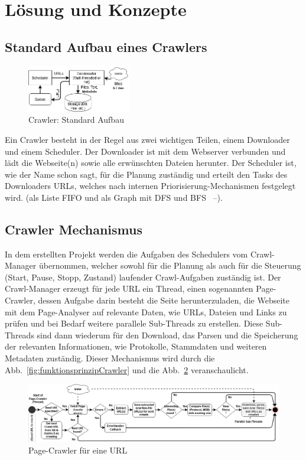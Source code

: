 \section{Lösung und Konzepte}\label{sec:02_03_loesung_konzept}
\subsection{Standard Aufbau eines Crawlers}
\begin{figure}
  \centering
    \includegraphics[width=0.4\textwidth]{images/02-Crawler/Crawler-Standard-Crawler.png}
  \caption{\label{fig:standardCrawler}Crawler: Standard Aufbau}
\end{figure}
Ein Crawler besteht in der Regel aus zwei wichtigen Teilen, einem Downloader und einem Scheduler. Der Downloader ist mit dem Webserver verbunden und lädt die Webseite(n) sowie alle erwünschten Dateien herunter. Der Scheduler ist, wie der Name schon sagt, für die Planung zuständig und erteilt den Tasks des Downloaders URLs, welches nach internen Priorisierung-Mechanismen festgelegt wird. (als Liste FIFO und als Graph mit DFS und BFS ~\cite{ThomasAlgorithms2009}--\cite{DonaldKnuth1998}). 
\subsection{Crawler Mechanismus}
In dem erstellten Projekt werden die Aufgaben des Schedulers vom Crawl-Manager übernommen, welcher sowohl für die Planung als auch für die Steuerung (Start, Pause, Stopp, Zustand) laufender Crawl-Aufgaben zuständig ist. Der Crawl-Manager erzeugt für jede URL ein Thread, einen sogenannten Page-Crawler, dessen Aufgabe darin besteht die Seite herunterzuladen, die Webseite mit dem Page-Analyser auf relevante Daten, wie URLs, Dateien und Links zu prüfen und bei Bedarf weitere parallele Sub-Threads zu erstellen. Diese Sub-Threads sind dann wiederum für den Download, das Parsen und die Speicherung der relevanten Informationen, wie Protokolle, Stammdaten und weiteren Metadaten zuständig. Dieser Mechanismus wird durch die Abb.~\ref{fig:funktionsprinzipCrawler} und die Abb.~\ref{fig:crawlEinerUrl} veranschaulicht.

\begin{figure}[H]
    \centering
    \includegraphics[width=5.5in]{images/02-Crawler/Crawler-Process-Diagram (Page-Crawler).png}
    \caption{Page-Crawler für eine URL}
    \label{fig:crawlEinerUrl}
\end{figure}

